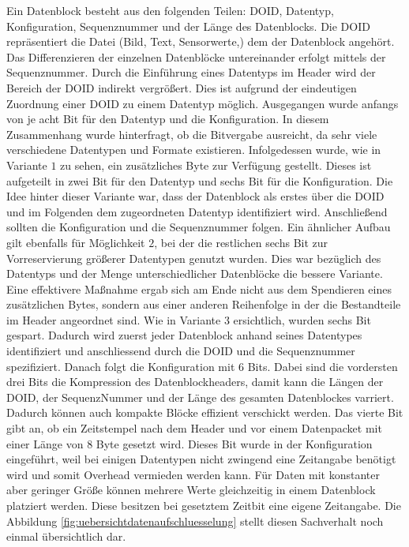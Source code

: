 Ein Datenblock besteht aus den folgenden Teilen: \gls{DOID}, Datentyp,
Konfiguration, Sequenznummer und der Länge des Datenblocks. Die \gls{DOID}
repräsentiert die Datei (Bild, Text, Sensorwerte,\etc) dem der Datenblock
angehört. Das Differenzieren der einzelnen Datenblöcke untereinander erfolgt
mittels der Sequenznummer. Durch die Einführung eines Datentyps im Header wird
der Bereich der \gls{DOID} indirekt vergrößert. Dies ist aufgrund der
eindeutigen Zuordnung einer \gls{DOID} zu einem Datentyp möglich.
\newline
Ausgegangen wurde anfangs von je acht Bit für den Datentyp und
die Konfiguration.
In diesem Zusammenhang wurde hinterfragt, ob die Bitvergabe ausreicht,
da sehr viele verschiedene Datentypen und Formate existieren. Infolgedessen
wurde, wie in Variante $1$ zu sehen, ein zusätzliches Byte zur Verfügung
gestellt. Dieses ist aufgeteilt in zwei Bit für den Datentyp und sechs Bit für
die Konfiguration. Die Idee hinter dieser Variante war, dass der Datenblock als
erstes über die \gls{DOID} und im Folgenden dem zugeordneten Datentyp identifiziert
wird. Anschließend sollten die Konfiguration und die Sequenznummer folgen.
Ein ähnlicher Aufbau gilt ebenfalls für Möglichkeit $2$, bei der die restlichen
sechs Bit zur Vorreservierung größerer Datentypen genutzt wurden. Dies war
bezüglich des Datentyps und der Menge unterschiedlicher Datenblöcke die bessere
Variante. Eine effektivere Maßnahme ergab sich am Ende nicht aus dem
Spendieren eines zusätzlichen Bytes, sondern aus einer anderen Reihenfolge in
der die Bestandteile im Header angeordnet sind. Wie in Variante $3$ ersichtlich,
wurden sechs Bit gespart. Dadurch wird zuerst jeder Datenblock anhand
seines Datentypes identifiziert und anschliessend durch die \gls{DOID} und die
Sequenznummer spezifiziert. Danach folgt die Konfiguration mit $6$ Bits.
Dabei sind die vordersten drei Bits die Kompression des Datenblockheaders, damit
kann die Längen der \gls{DOID}, der SequenzNummer und der Länge des gesamten
Datenblockes varriert. Dadurch können auch kompakte Blöcke effizient verschickt
werden.
Das vierte Bit gibt an, ob ein Zeitstempel nach dem Header und vor einem
Datenpacket mit einer Länge von $8$ Byte gesetzt wird.
Dieses Bit wurde in der Konfiguration eingeführt, weil bei einigen Datentypen
nicht zwingend eine Zeitangabe benötigt wird und somit Overhead vermieden
werden kann. Für Daten mit konstanter aber geringer Größe können mehrere Werte
gleichzeitig in einem Datenblock platziert werden. Diese besitzen bei
gesetztem Zeitbit eine eigene Zeitangabe. Die Abbildung
\ref{fig:uebersichtdatenaufschluesselung} stellt diesen Sachverhalt noch einmal
übersichtlich dar.

